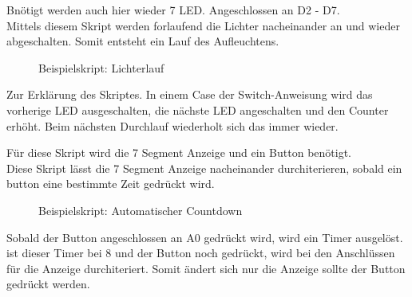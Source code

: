 Bnötigt werden auch hier wieder 7 LED. Angeschlossen an D2 - D7.\\
Mittels diesem Skript werden forlaufend die Lichter nacheinander an und wieder
abgeschalten. Somit entsteht ein Lauf des Aufleuchtens.\newline

\begin{figure}[H]

\caption{Beispielskript: Lichterlauf}
\label{output}
\end{figure}
Zur Erklärung des Skriptes. In einem Case der Switch-Anweisung wird das
vorherige LED ausgeschalten, die nächste LED angeschalten und den Counter
erhöht. Beim nächsten Durchlauf wiederholt sich das immer wieder.


Für diese Skript wird die 7 Segment Anzeige und ein Button benötigt.\\
Diese Skript lässt die 7 Segment Anzeige nacheinander durchiterieren, sobald
ein button eine bestimmte Zeit gedrückt wird.\newline
\begin{figure}[H]

\caption{Beispielskript: Automatischer Countdown}
\label{output}
\end{figure}
Sobald der Button angeschlossen an A0 gedrückt wird, wird ein Timer ausgelöst.
ist dieser Timer bei 8 und der Button noch gedrückt, wird bei den Anschlüssen
für die Anzeige durchiteriert. Somit ändert sich nur die Anzeige sollte der
Button gedrückt werden. 

